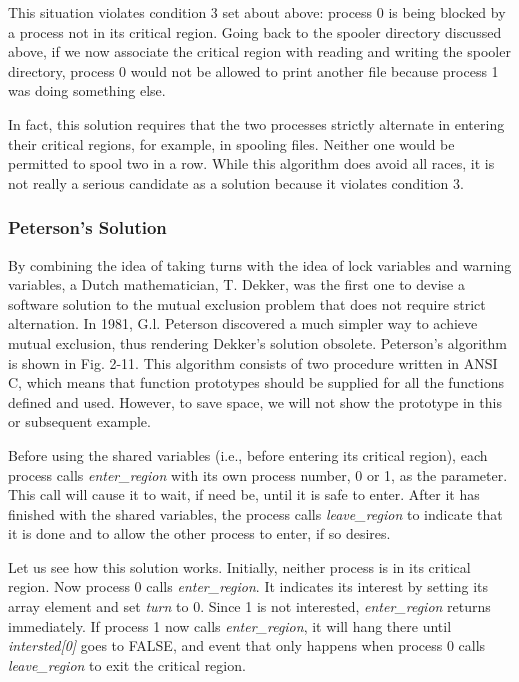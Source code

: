 \documentclass{book}
\newcommand {\sys} [1] {\textsl{#1}}
\begin{document}
This situation violates condition 3 set about above: 
process 0 is being blocked by a process not in its critical region.
Going back to the spooler directory discussed above,
if we now associate the critical region with reading and writing the spooler directory, 
process 0 would not be allowed to print another file because process 1 was doing something else.

In fact, this solution requires that the two processes strictly alternate in entering their critical regions,
for example, in spooling files.
Neither one would be permitted to spool two in a row.
While this algorithm does avoid all races, it is not really a serious candidate as a solution 
because it violates condition 3.

\subsubsection*{Peterson's Solution}
By combining the idea of taking turns with the idea of lock variables and warning variables,
a Dutch mathematician, T. Dekker, was the first one to devise a software solution to the mutual exclusion problem
that does not require strict alternation.
In 1981, G.l. Peterson discovered a much simpler way to achieve mutual exclusion, 
thus rendering Dekker's solution obsolete.
Peterson's algorithm is shown in Fig. 2-11.
This algorithm consists of two procedure written in ANSI C, 
which means that function prototypes should be supplied for all the functions defined and used.
However, to save space, we will not show the prototype in this or subsequent example.

Before using the shared variables (i.e., before entering its critical region),
each process calls \sys{enter\_region} with its own process number, 0 or 1, as the parameter.
This call will cause it to wait, if need be, until it is safe to enter.
After it has finished with the shared variables, the process calls \sys{leave\_region} to indicate that it is done 
and to allow the other process to enter, if so desires.

Let us see how this solution works.
Initially, neither process is in its critical region.
Now process 0 calls \sys{enter\_region}.
It indicates its interest by setting its array element and set \sys{turn} to 0.
Since 1 is not interested, \sys{enter\_region} returns immediately.
If process 1 now calls \sys{enter\_region}, it will hang there until \sys{intersted[0]} goes to FALSE, 
and event that only happens when process 0 calls \sys{leave\_region} to exit the critical region.
\end{document}
